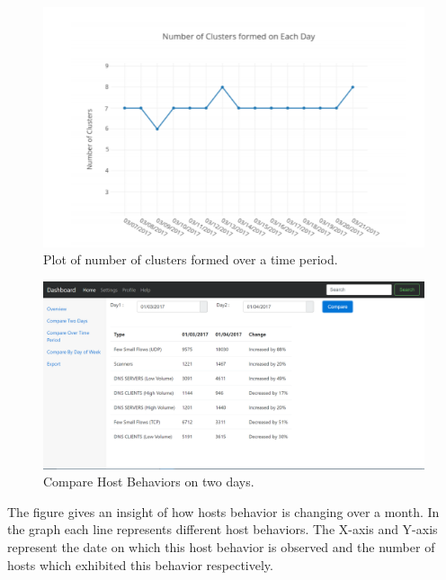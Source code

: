 \begin{figure}[t]
	\centerline{\includegraphics{constant.png}}
	\caption{ Plot of number of clusters formed over a time period.}%
\end{figure} 

\begin{figure}[t]
	\centerline{\includegraphics[scale = 0.45]{tool_compare_days.png}}
	\caption{Compare Host Behaviors on two days.}%
\end{figure} 

The figure  gives an insight of how hosts behavior is changing over a month.
In the graph each line represents different host behaviors. The X-axis and Y-axis
represent the date on which this host behavior is observed and the number of hosts
which exhibited this behavior respectively.

